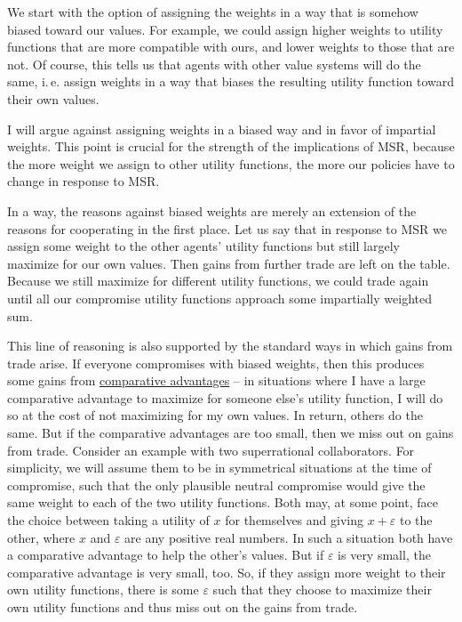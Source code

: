 We start with the option of assigning the weights in a way that is
somehow biased toward our values. For example, we could assign higher
weights to utility functions that are more compatible with ours, and
lower weights to those that are not. Of course, this tells us that
agents with other value systems will do the same, i.\,e. assign weights in
a way that biases the resulting utility function toward their own values.

I will argue against assigning weights in a biased way and in favor of
impartial weights. This point is crucial for the strength of the
implications of MSR, because the more weight we assign to other utility
functions, the more our policies have to change in response to MSR.

In a way, the reasons against biased weights are merely an extension of
the reasons for cooperating in the first place. Let us say that in
response to MSR we assign some weight to the other agents' utility
functions but still largely maximize for our own values. Then gains from
further trade are left on the table. Because we still maximize for
different utility functions, we could trade again until all our
compromise utility functions approach some impartially weighted sum.

This line of reasoning is also supported by the standard ways in which
gains from trade arise. If everyone compromises with biased weights,
then this produces some gains from
\href{https://en.wikipedia.org/wiki/Comparative_advantage}{comparative
advantages} -- in situations where I have a large comparative advantage
to maximize for someone else's utility function, I will do so at the
cost of not maximizing for my own values. In return, others do the same.
But if the comparative advantages are too small, then we miss out on
gains from trade. Consider an example with two superrational
collaborators. For simplicity, we will assume them to be in symmetrical
situations at the time of compromise, such that the only plausible
neutral compromise would give the same weight to each of the two utility
functions. Both may, at some point, face the choice between taking a
utility of \(x\) for themselves and giving \(x + \varepsilon\) to the
other, where \(x\) and \(\varepsilon\) are any positive real numbers. In
such a situation both have a comparative advantage to help the other's
values. But if \(\varepsilon\) is very small, the comparative advantage
is very small, too. So, if they assign more weight to their own utility
functions, there is some \(\varepsilon\) such that they choose to
maximize their own utility functions and thus miss out on the gains from
trade.

